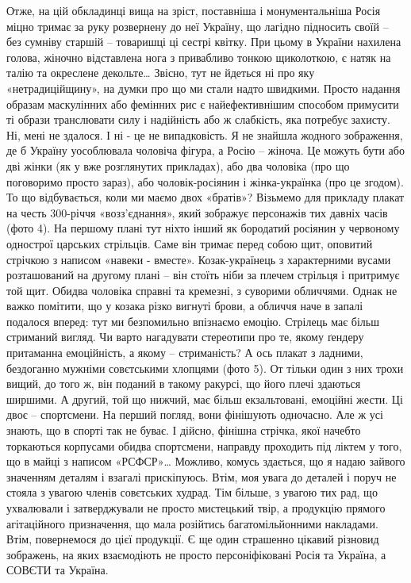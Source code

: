 Отже, на цій обкладинці вища на зріст, поставніша і монументальніша Росія міцно тримає за руку розвернену до неї Україну, що лагідно підносить своїй – без сумніву старшій – товаришці ці сестрі квітку. При цьому в України нахилена голова, жіночно відставлена нога з привабливо тонкою щиколоткою, є натяк на талію та окреслене декольте…
Звісно, тут не йдеться ні про яку «нетрадиційщину», на думки про що ми стали надто швидкими. Просто надання образам маскулінних або фемінних рис є найефективнішим способом примусити ті образи транслювати силу і надійність або ж слабкість, яка потребує захисту.
Ні, мені не здалося. І ні - це не випадковість. Я не знайшла жодного зображення, де б Україну уособлювала чоловіча фігура, а Росію – жіноча. Це можуть бути або дві жінки (як у вже розглянутих прикладах), або два чоловіка (про що поговоримо просто зараз), або чоловік-росіянин і жінка-українка (про це згодом).
То що відбувається, коли ми маємо двох «братів»? Візьмемо для прикладу плакат на честь 300-річчя «возз’єднання», який зображує персонажів тих давніх часів (фото 4).
На першому плані тут ніхто інший як бородатий росіянин у червоному однострої царських стрільців. Саме він тримає перед собою щит, оповитий стрічкою з написом «навеки - вместе». Козак-українець з характерними вусами розташований на другому плані – він стоїть ніби за плечем стрільця і притримує той щит.
Обидва чоловіка справні та кремезні, з суворими обличчями. Однак не важко помітити, що у козака різко вигнуті брови, а обличчя наче в запалі подалося вперед: тут ми безпомильно впізнаємо емоцію. Стрілець має більш стриманий вигляд. Чи варто нагадувати стереотипи про те, якому ґендеру притаманна емоційність, а якому – стриманість? 
А ось плакат з ладними, бездоганно мужніми совєтськими хлопцями (фото 5). От тільки один з них трохи вищий, до того ж, він поданий в такому ракурсі, що його плечі здаються ширшими. А другий, той що нижчий, має більш екзальтовані, емоційні жести. Ці двоє – спортсмени. На перший  погляд, вони фінішують одночасно. Але ж усі знають, що в спорті так не буває. І дійсно, фінішна стрічка, якої начебто торкаються корпусами обидва спортсмени, направду проходить під ліктем у того, що в майці з написом «РСФСР»…
Можливо, комусь здається, що я надаю зайвого значенням деталям і взагалі прискіпуюсь. Втім, моя увага до деталей і поруч не стояла з увагою членів совєтських худрад. Тім більше, з увагою тих рад, що ухвалювали і затверджували не просто мистецький твір, а продукцію прямого агітаційного призначення, що мала розійтись багатомільйонними накладами. 
Втім, повернемося до цієї продукції. Є ще один страшенно цікавий різновид зображень, на яких взаємодіють не просто персоніфіковані Росія та Україна, а СОВЄТИ та Україна.
